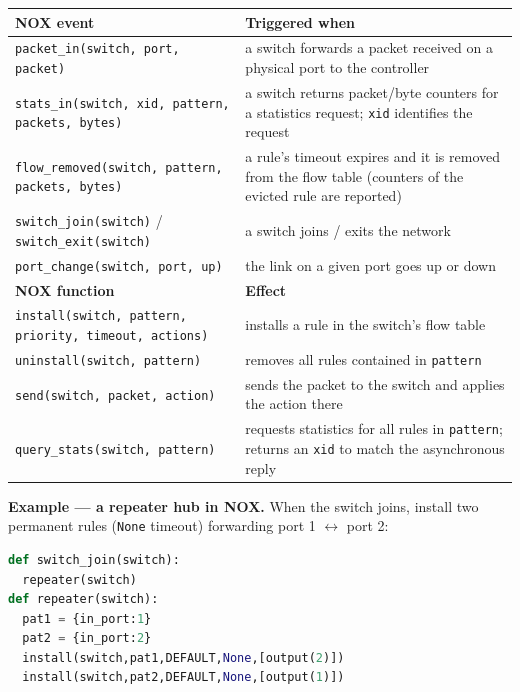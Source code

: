 \begin{center}
\begin{tabularx}{\linewidth}{@{}l X@{}}
\toprule
\textbf{NOX event} & \textbf{Triggered when} \\
\midrule
\texttt{packet\_in(switch, port, packet)} & a switch forwards a packet received on a physical port to the controller \\
\texttt{stats\_in(switch, xid, pattern, packets, bytes)} & a switch returns packet/byte counters for a statistics request; \texttt{xid} identifies the request \\
\texttt{flow\_removed(switch, pattern, packets, bytes)} & a rule's timeout expires and it is removed from the flow table (counters of the evicted rule are reported) \\
\texttt{switch\_join(switch)} / \texttt{switch\_exit(switch)} & a switch joins / exits the network \\
\texttt{port\_change(switch, port, up)} & the link on a given port goes up or down \\
\midrule
\textbf{NOX function} & \textbf{Effect} \\
\midrule
\texttt{install(switch, pattern, priority, timeout, actions)} & installs a rule in the switch's flow table \\
\texttt{uninstall(switch, pattern)} & removes all rules contained in \texttt{pattern} \\
\texttt{send(switch, packet, action)} & sends the packet to the switch and applies the action there \\
\texttt{query\_stats(switch, pattern)} & requests statistics for all rules in \texttt{pattern}; returns an \texttt{xid} to match the asynchronous reply \\
\bottomrule
\end{tabularx}
\end{center}

\textbf{Example --- a repeater hub in NOX.} When the switch joins, install two permanent rules (\texttt{None} timeout) forwarding port 1 $\leftrightarrow$ port 2:
\begin{lstlisting}[language=Python]
def switch_join(switch):
  repeater(switch)
def repeater(switch):
  pat1 = {in_port:1}
  pat2 = {in_port:2}
  install(switch,pat1,DEFAULT,None,[output(2)])
  install(switch,pat2,DEFAULT,None,[output(1)])
\end{lstlisting}

